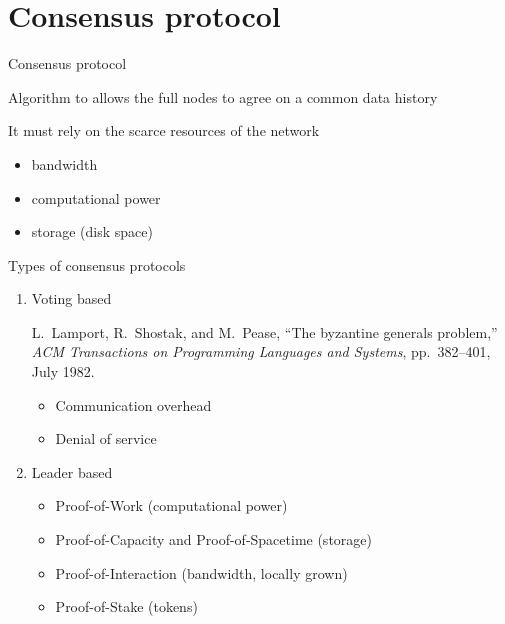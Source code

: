 \documentclass{beamer}
\begin{document}
\section{Consensus protocol}
\begin{frame}{Consensus protocol}
\begin{tcolorbox}[enhanced,drop shadow, title=Definition]
    Algorithm to allows the full nodes to agree on a common data history
\end{tcolorbox}
It must rely on the scarce resources of the network
\begin{itemize}
  \item bandwidth
  \item computational power
  \item storage (disk space)
\end{itemize}
\end{frame}
\begin{frame}{Types of consensus protocols}
\begin{enumerate}
  \item Voting based 
  \footnotesize
\begin{thebibliography}{1}

L.~Lamport, R.~Shostak, and M.~Pease, ``The byzantine generals problem,'' {\em
  ACM Transactions on Programming Languages and Systems}, pp.~382--401, July
  1982.

\end{thebibliography}
\normalsize
\begin{itemize}
  \item[\danger] Communication overhead
  \item[\danger] Denial of service
\end{itemize}

  \item Leader based
  \begin{itemize}
    \item Proof-of-Work (computational power)
    \item Proof-of-Capacity and Proof-of-Spacetime (storage)
    \item Proof-of-Interaction (bandwidth, locally grown)
    \item Proof-of-Stake (tokens)
  \end{itemize}
\end{enumerate}
\end{frame}
\end{document}
